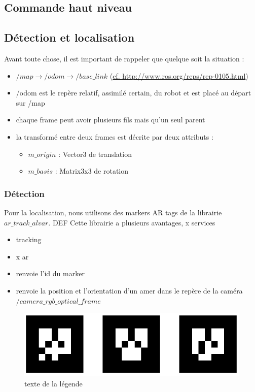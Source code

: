 \documentclass[10pt,a4paper]{article}
\begin{document}
\subsection{Commande haut niveau}
\label{sec:commande_haut_niveau}

\subsection{Détection et localisation}
\label{sec:detection_et_localisation}


\noindent Avant toute chose, il est important de rappeler que quelque soit la situation :
\begin{itemize}
\item $/map \rightarrow /odom \rightarrow /base\_link $ (\url{cf. http://www.ros.org/reps/rep-0105.html})
\item /odom est le repère relatif, assimilé certain, du robot et est placé au départ sur /map
\item chaque frame peut avoir plusieurs fils mais qu'un seul parent
\item la transformé entre deux frames est décrite par deux attributs : 
  \begin{itemize}
  \item $m\_origin$ : Vector3 de translation 
  \item $m\_basis$ : Matrix3x3 de rotation
  \end{itemize}
\end{itemize}

\subsubsection{Détection}
\label{sec:detection}

Pour la localisation, nous utilisons des markers AR tags de la librairie $ar\_track\_alvar$. DEF 
Cette librairie a plusieurs avantages, x services 

\begin{itemize}
\item tracking
\item x ar
\item renvoie l'id du marker 
\item renvoie la position et l'orientation d'un amer dans le repère de la caméra $/camera\_rgb\_optical\_frame$
\end{itemize}

\begin{figure}
\center
\includegraphics[scale=0.6]{figures/artags.png} 
\caption{texte de la légende}	
\end{figure}
\end{document}

